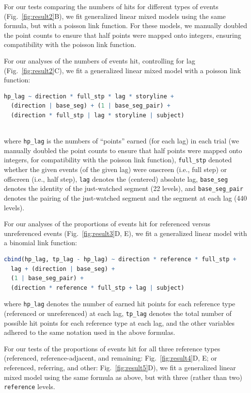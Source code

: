 \documentclass[10pt]{article}
\begin{document}
For our tests comparing the numbers of hits for different types of events (Fig.~\ref{fig:result2}B), we fit generalized linear mixed models using the same formula, but with a poisson link function.  For these models, we manually doubled the point counts to ensure that half points were mapped onto integers, ensuring compatibility with the poisson link function.

For our analyses of the numbers of events hit, controlling for lag (Fig.~\ref{fig:result2}C), we fit a generalized linear mixed model with a poisson link function:
\begin{lstlisting}[language=R]
  hp_lag ~ direction * full_stp * lag * storyline +
  (direction | base_seg) + (1 | base_seg_pair) +
  (direction * full_stp | lag * storyline | subject)
  
\end{lstlisting}
where \texttt{hp\_lag} is the numbers of ``points'' earned (for each lag) in each trial (we manually doubled the point counts to ensure that half points were mapped onto integers, for compatibility with the poisson link function), \texttt{full\_stp} denoted whether the given events (of the given lag) were onscreen (i.e., full step) or offscreen (i.e., half step), \texttt{lag} denotes the (centered) absolute lag, \texttt{base\_seg} denotes the identity of the just-watched segment (22 levels), and \texttt{base\_seg\_pair} denotes the pairing of the just-watched segment and the segment at each lag (440 levels).

For our analyses of the proportions of events hit for referenced versus unreferenced events (Fig.~\ref{fig:result3}D, E), we fit a generalized linear model with a binomial link function:
\begin{lstlisting}[language=R]
  cbind(hp_lag, tp_lag - hp_lag) ~ direction * reference * full_stp +
  lag + (direction | base_seg) +
  (1 | base_seg_pair) +
  (direction * reference * full_stp + lag | subject)
\end{lstlisting}
where \texttt{hp\_lag} denotes the number of earned hit points for each reference type (referenced or unreferenced) at each lag, \texttt{tp\_lag} denotes the total number of possible hit points for each reference type at each lag, and the other variables adhered to the same notation used in the above formulas.

For our tests of the proportions of events hit for all three reference types (referenced, reference-adjacent, and remaining: Fig.~\ref{fig:result4}D, E; or referenced, referring, and other: Fig.~\ref{fig:result5}D), we fit a generalized linear mixed model using the same formula as above, but with three (rather than two) \texttt{reference} levels.
\end{document}

